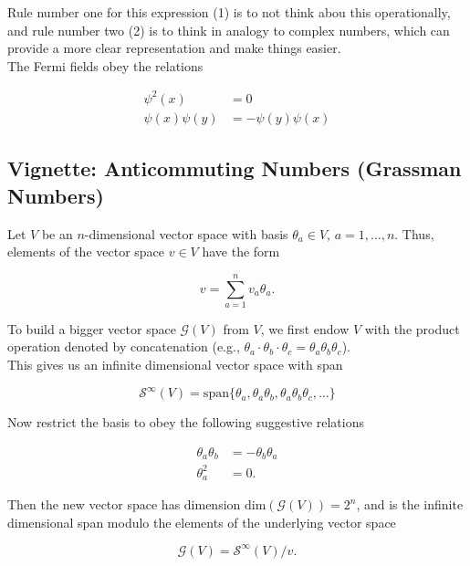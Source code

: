 \noindent Rule number one for this expression (1) is to not think abou this operationally, and rule number two (2) is to think in analogy to complex numbers, which can provide a more clear representation and make things easier.  \\

\noindent The Fermi fields obey the relations

\begin{align}
\psi^2 (x) &= 0 \\
\psi (x) \psi (y) &= - \psi (y) \psi (x)
\end{align}

\subsection*{Vignette: Anticommuting Numbers (Grassman Numbers)}

\noindent Let $V$ be an $n$-dimensional vector space with basis $\theta_a \in V$, $a=1,\dots,n$. Thus, elements of the vector space $v \in V$ have the form 

\begin{equation}
v = \sum_{a=1}^n v_a \theta_a.
\end{equation}

\noindent To build a bigger vector space $\mathcal{G}(V)$ from $V$, we first endow $V$ with the product operation denoted by concatenation (e.g., $\theta_a \cdot \theta_b \cdot \theta_c = \theta_a \theta_b \theta_c$). \\

\noindent This gives us an infinite dimensional vector space with span

\begin{equation}
\mathcal{S}^{\infty} (V) = \text{span} \{ \theta_a, \theta_a \theta_b, \theta_a \theta_b \theta_c, \dots \}
\end{equation}

\noindent Now restrict the basis to obey the following suggestive relations

\begin{align}
\theta_a \theta_b &= - \theta_b \theta_a \\
\theta_a^2 &= 0.
\end{align}

\noindent Then the new vector space has dimension $\text{dim}(\mathcal{G} (V)) = 2^n$, and is the infinite dimensional span modulo the elements of the underlying vector space

\begin{equation}
\mathcal{G}(V) = \mathcal{S}^{\infty} (V) / v.
\end{equation}

